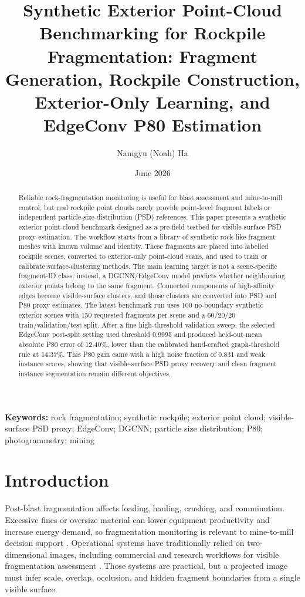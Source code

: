 \documentclass[11pt]{article}
\title{Synthetic Exterior Point-Cloud Benchmarking for Rockpile Fragmentation: Fragment Generation, Rockpile Construction, Exterior-Only Learning, and EdgeConv P80 Estimation}
\author[1]{Namgyu (Noah) Ha}
\affil[1]{Department of Energy and Resources Engineering, National Korea Maritime and Ocean University, Busan, Republic of Korea}
\date{June 2026}
\begin{document}
\maketitle

\begin{abstract}
Reliable rock-fragmentation monitoring is useful for blast assessment and mine-to-mill control, but real rockpile point clouds rarely provide point-level fragment labels or independent particle-size-distribution (PSD) references. This paper presents a synthetic exterior point-cloud benchmark designed as a pre-field testbed for visible-surface PSD proxy estimation. The workflow starts from a library of synthetic rock-like fragment meshes with known volume and identity. These fragments are placed into labelled rockpile scenes, converted to exterior-only point-cloud scans, and used to train or calibrate surface-clustering methods. The main learning target is not a scene-specific fragment-ID class; instead, a DGCNN/EdgeConv model predicts whether neighbouring exterior points belong to the same fragment. Connected components of high-affinity edges become visible-surface clusters, and those clusters are converted into PSD and P80 proxy estimates. The latest benchmark run uses 100 no-boundary synthetic exterior scenes with 150 requested fragments per scene and a 60/20/20 train/validation/test split. After a fine high-threshold validation sweep, the selected EdgeConv post-split setting used threshold 0.9995 and produced held-out mean absolute P80 error of 12.40\%, lower than the calibrated hand-crafted graph-threshold rule at 14.37\%. This P80 gain came with a high noise fraction of 0.831 and weak instance scores, showing that visible-surface PSD proxy recovery and clean fragment instance segmentation remain different objectives.
\end{abstract}

\textbf{Keywords:} rock fragmentation; synthetic rockpile; exterior point cloud; visible-surface PSD proxy; EdgeConv; DGCNN; particle size distribution; P80; photogrammetry; mining

\section{Introduction}
Post-blast fragmentation affects loading, hauling, crushing, and comminution. Excessive fines or oversize material can lower equipment productivity and increase energy demand, so fragmentation monitoring is relevant to mine-to-mill decision support \cite{cunningham1983,ouchterlony2005}. Operational systems have traditionally relied on two-dimensional images, including commercial and research workflows for visible fragmentation assessment \cite{palangio1995,siddiqui2009}. Those systems are practical, but a projected image must infer scale, overlap, occlusion, and hidden fragment boundaries from a single visible surface.
\end{document}
